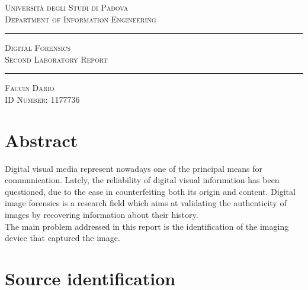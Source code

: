 \documentclass[a4paper, 12pt]{article}
\begin{document}
\begin{titlepage}


\vspace*{1cm}

\begin{center}
\large \textsc{Università degli Studi di Padova \\ Department of Information Engineering}

\vspace*{1cm}

\rule{\linewidth}{1pt} \Huge{ \textsc{Digital Forensics}} \\ {\textsc{Second Laboratory Report}} \rule{\linewidth}{2pt}

\vspace*{1cm}

\large \textsc{Faccin Dario} \\
\normalsize \textsc{ID Number: 1177736}

\end{center}

\section*{Abstract}
Digital visual media represent nowadays one of the principal means for
communication. Lately, the reliability of digital visual information has been questioned,
due to the ease in counterfeiting both its origin and content. Digital image forensics is a research field which aims at validating the authenticity of images by recovering
information about their history.\\
The main problem addressed in this report is the identification of the
imaging device that captured the image.
\end{titlepage}

\section*{Source identification}
\end{document}
